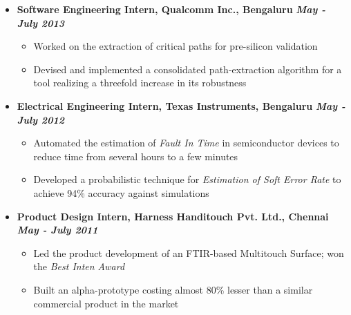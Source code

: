\documentclass[10pt,a4paper,English]{article}
\newcommand\itemyear[1]{\hfill \textbf{\emph{\color{itemyear} #1}}}
\newcommand\itemenv{\setlength\itemsep{0.5pt} \addtolength{\itemindent}{-5mm}\vspace{-1.5mm}}
\begin{document}
\begin{itemize}
    \item \textbf{Software Engineering Intern, Qualcomm Inc., Bengaluru} \itemyear{May - July 2013}
        \begin{itemize} \itemenv
            \item Worked on the extraction of critical paths for pre-silicon validation
            \item Devised and implemented a consolidated path-extraction algorithm for a tool realizing a threefold increase in its robustness
        \end{itemize}

    \item \textbf{Electrical Engineering Intern, Texas Instruments, Bengaluru} \itemyear{May - July 2012}
        \begin{itemize} \itemenv
            \item Automated the estimation of \textit{Fault In Time} in semiconductor devices to reduce time from several hours to a few minutes
            \item Developed a probabilistic technique for \emph{Estimation of Soft Error Rate} to achieve 94\% accuracy against simulations
        \end{itemize}

    \item \textbf{Product Design Intern, Harness Handitouch Pvt. Ltd., Chennai} \itemyear{May - July 2011}
        \begin{itemize} \itemenv
            \item Led the product development of an FTIR-based Multitouch Surface; won the \textit{Best Inten Award}
            \item Built an alpha-prototype costing almost 80\% lesser than a similar commercial product in the market
        \end{itemize}

    \end{itemize}
\end{document}
